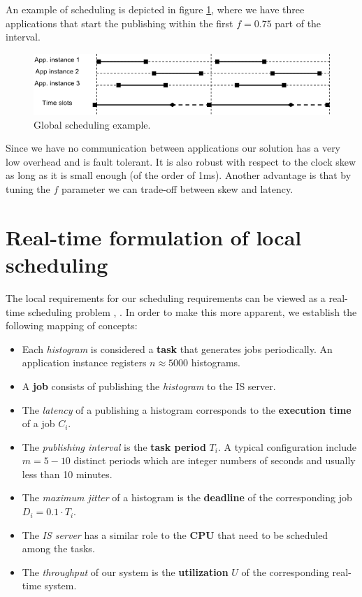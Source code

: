 An example of scheduling is depicted in figure \ref{fig:local_sched}, where we have three applications that start the publishing within the first $f=0.75$ part of the interval.

\begin{figure}[ht!]
\centering
\includegraphics[scale=0.6]{Images/local_sched.png}
\caption{Global scheduling example.}
\label{fig:local_sched}
\end{figure}

Since we have no communication between applications our solution has a very low overhead and is fault tolerant. It is also robust with respect to the clock skew as long as it is small enough (of the order of 1ms). Another advantage is that by tuning the $f$ parameter we can trade-off between skew and latency. 

\section{Real-time formulation of local scheduling}

The local requirements for our scheduling requirements can be viewed as a real-time scheduling problem \citep{liu1973scheduling}, \citep{sha2004real}. In order to make this more apparent, we establish the following mapping of concepts:
\begin{itemize}
\item Each \emph{histogram} is considered a {\bf task} that generates jobs periodically. An application instance registers $n \approx 5000$ histograms.
\item A {\bf job} consists of publishing the \emph{histogram} to the IS server.
\item The \emph{latency} of a publishing a histogram corresponds to the {\bf execution time} of a job $C_i$. 
\item The \emph{publishing interval} is the {\bf task period} $T_i$. A typical configuration include $m=5-10$ distinct periods which are integer numbers of seconds and usually less than 10 minutes.
\item The \emph{maximum jitter} of a histogram is the {\bf deadline} of the corresponding job $D_i=0.1\cdot T_i$.
\item The \emph{IS server} has a similar role to the {\bf CPU} that need to be scheduled among the tasks.
\item The \emph{throughput} of our system is the {\bf utilization} $U$ of the corresponding real-time system.
\end{itemize}

